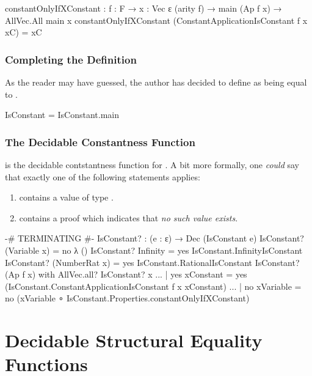 \documentclass{report}
\begin{document}
\begin{code}
      constantOnlyIfXConstant :
        {f : F} → {x : Vec ε (arity f)} → main (Ap f x) → AllVec.All main x
      constantOnlyIfXConstant (ConstantApplicationIsConstant f x xC) = xC
\end{code}

\subsection{Completing the Definition}
As the reader may have guessed, the author has decided to define  as being equal to .

\begin{code}
  IsConstant = IsConstant.main
\end{code}

\subsection{The Decidable Constantness Function}
 is the decidable contstantness function for .  A bit more formally, one \emph{could} say that exactly one of the following statements applies:

\begin{enumerate}
  \item {}  contains a value of type  .
  \item {}  contains a proof which indicates that \emph{no such value exists}.
\end{enumerate}

\begin{code}
  {-# TERMINATING #-}
  IsConstant? : (e : ε) → Dec (IsConstant e)
  IsConstant? (Variable x) = no λ ()
  IsConstant? Infinity = yes IsConstant.InfinityIsConstant
  IsConstant? (NumberRat x) = yes IsConstant.RationalIsConstant
  IsConstant? (Ap f x) with AllVec.all? IsConstant? x
  ... | yes xConstant = yes (IsConstant.ConstantApplicationIsConstant f x xConstant)
  ... | no xVariable = no (xVariable ∘ IsConstant.Properties.constantOnlyIfXConstant)
\end{code}

\chapter{Decidable Structural Equality Functions}
\end{document}
